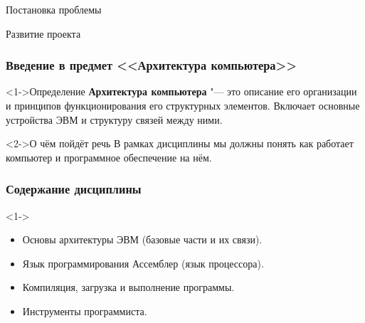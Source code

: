 \documentclass[pdf,9pt,aspectratio=169]{beamer}
\begin{document}
\begin{frame}{Постановка проблемы}
\begin{exampleblock}{Развитие проекта}
\begin{center}
    \end{center}
  \end{exampleblock}
\end{frame}


\begin{frame}\frametitle{Введение в предмет <<Архитектура компьютера>>}
  \begin{block}<1->{Определение}
    \textbf{Архитектура компьютера} "---  это описание его организации и принципов функционирования его структурных элементов. Включает основные устройства ЭВМ и структуру связей между ними.
  \end{block}
  \begin{block}<2->{О чём пойдёт речь}
    В рамках дисциплины мы должны понять как работает компьютер и программное обеспечение на нём.
  \end{block}
\end{frame}

\begin{frame}\frametitle{Содержание дисциплины}
  \begin{block}<1->{}
    \begin{itemize}
      \item Основы архитектуры ЭВМ (базовые части и их связи).
      \item Язык программирования Ассемблер (язык процессора).
      \item Компиляция, загрузка и выполнение программы.
      \item Инструменты программиста.
    \end{itemize}
  \end{block}
\end{frame}
\end{document}
